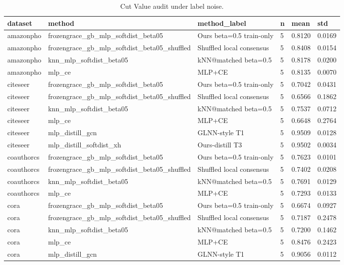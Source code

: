 \begin{table}[t]
\centering
\caption{Cut Value audit under label noise.}
\label{tab:cut-value}
\begin{tabular}{llllll}
\toprule
dataset & method & method_label & n & mean & std \\
\midrule
amazonpho & frozengrace_gb_mlp_softdist_beta05 & Ours beta=0.5 train-only & 5 & 0.8120 & 0.0169 \\
amazonpho & frozengrace_gb_mlp_softdist_beta05_shuffled & Shuffled local consensus & 5 & 0.8408 & 0.0154 \\
amazonpho & knn_mlp_softdist_beta05 & kNN@matched beta=0.5 & 5 & 0.8178 & 0.0200 \\
amazonpho & mlp_ce & MLP+CE & 5 & 0.8135 & 0.0070 \\
citeseer & frozengrace_gb_mlp_softdist_beta05 & Ours beta=0.5 train-only & 5 & 0.7042 & 0.0431 \\
citeseer & frozengrace_gb_mlp_softdist_beta05_shuffled & Shuffled local consensus & 5 & 0.6566 & 0.1862 \\
citeseer & knn_mlp_softdist_beta05 & kNN@matched beta=0.5 & 5 & 0.7537 & 0.0712 \\
citeseer & mlp_ce & MLP+CE & 5 & 0.6648 & 0.2764 \\
citeseer & mlp_distill_gcn & GLNN-style T1 & 5 & 0.9509 & 0.0128 \\
citeseer & mlp_distill_softdist_xh & Ours-distill T3 & 5 & 0.9502 & 0.0034 \\
coauthorcs & frozengrace_gb_mlp_softdist_beta05 & Ours beta=0.5 train-only & 5 & 0.7623 & 0.0101 \\
coauthorcs & frozengrace_gb_mlp_softdist_beta05_shuffled & Shuffled local consensus & 5 & 0.7402 & 0.0208 \\
coauthorcs & knn_mlp_softdist_beta05 & kNN@matched beta=0.5 & 5 & 0.7691 & 0.0129 \\
coauthorcs & mlp_ce & MLP+CE & 5 & 0.7293 & 0.0133 \\
cora & frozengrace_gb_mlp_softdist_beta05 & Ours beta=0.5 train-only & 5 & 0.6674 & 0.0927 \\
cora & frozengrace_gb_mlp_softdist_beta05_shuffled & Shuffled local consensus & 5 & 0.7187 & 0.2478 \\
cora & knn_mlp_softdist_beta05 & kNN@matched beta=0.5 & 5 & 0.7200 & 0.1462 \\
cora & mlp_ce & MLP+CE & 5 & 0.8476 & 0.2423 \\
cora & mlp_distill_gcn & GLNN-style T1 & 5 & 0.9056 & 0.0112 \\

\end{tabular}
\end{table}
